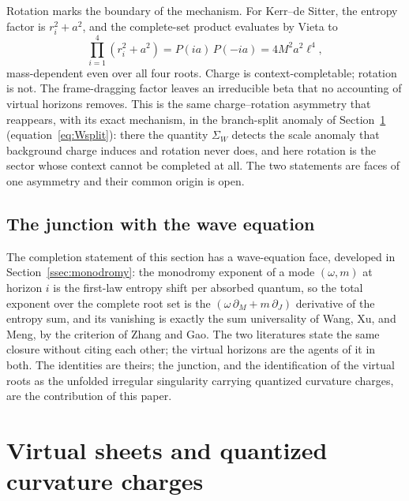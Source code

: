 Rotation marks the boundary of the mechanism. For Kerr--de Sitter, the entropy factor is $r_i^2 + a^2$, and the complete-set product evaluates by Vieta to
\begin{equation}
\prod_{i=1}^{4}\left(r_i^2 + a^2\right) = P(ia)\,P(-ia) = 4M^2 a^2 \ell^4,
\label{eq:rotation-boundary}
\end{equation}
mass-dependent even over all four roots. Charge is context-completable; rotation is not. The frame-dragging factor leaves an irreducible beta that no accounting of virtual horizons removes. This is the same charge--rotation asymmetry that reappears, with its exact mechanism, in the branch-split anomaly of Section~\ref{sec:virtual} (equation~\eqref{eq:Wsplit}): there the quantity $\Sigma_W$ detects the scale anomaly that background charge induces and rotation never does, and here rotation is the sector whose context cannot be completed at all. The two statements are faces of one asymmetry and their common origin is open.

\subsection{The junction with the wave equation}

The completion statement of this section has a wave-equation face, developed in Section~\ref{ssec:monodromy}: the monodromy exponent of a mode $(\omega, m)$ at horizon $i$ is the first-law entropy shift per absorbed quantum, so the total exponent over the complete root set is the $(\omega\,\partial_M + m\,\partial_J)$ derivative of the entropy sum, and its vanishing is exactly the sum universality of Wang, Xu, and Meng, by the criterion of Zhang and Gao. The two literatures state the same closure without citing each other; the virtual horizons are the agents of it in both. The identities are theirs; the junction, and the identification of the virtual roots as the unfolded irregular singularity carrying quantized curvature charges, are the contribution of this paper.



\section{Virtual sheets and quantized curvature charges}
\label{sec:virtual}

